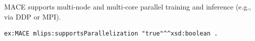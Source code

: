 MACE supports multi-node and multi-core parallel training and
inference (e.g., via DDP or MPI).
\begin{lstlisting}[language=turtle]
ex:MACE mlips:supportsParallelization "true"^^xsd:boolean .
\end{lstlisting}
